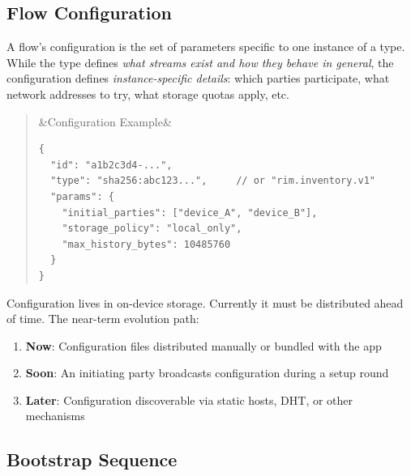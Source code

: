 \documentclass[11pt, letterpaper]{article}
\newenvironment{pseudocode}[1][]
  {\par\medskip\begin{quote}\small
   \ifx&#1&\else\noindent{\bfseries\color{rimblue} #1}\par\smallskip\fi
   \ttfamily}
  {\end{quote}\medskip}
\begin{document}
\subsection{Flow Configuration}

A flow's configuration is the set of parameters specific to one instance of a type.
While the type defines \emph{what streams exist and how they behave in general}, the
configuration defines \emph{instance-specific details}: which parties participate,
what network addresses to try, what storage quotas apply, etc.

\begin{pseudocode}[Configuration Example]
\begin{verbatim}
{
  "id": "a1b2c3d4-...",
  "type": "sha256:abc123...",     // or "rim.inventory.v1"
  "params": {
    "initial_parties": ["device_A", "device_B"],
    "storage_policy": "local_only",
    "max_history_bytes": 10485760
  }
}
\end{verbatim}
\end{pseudocode}

Configuration lives in on-device storage. Currently it must be distributed ahead of
time. The near-term evolution path:

\begin{enumerate}[leftmargin=2em]
  \item \textbf{Now}: Configuration files distributed manually or bundled with the app
  \item \textbf{Soon}: An initiating party broadcasts configuration during a setup round
  \item \textbf{Later}: Configuration discoverable via static hosts, DHT, or other mechanisms
\end{enumerate}

\subsection{Bootstrap Sequence}

\begin{center}
\end{center}
\end{document}
